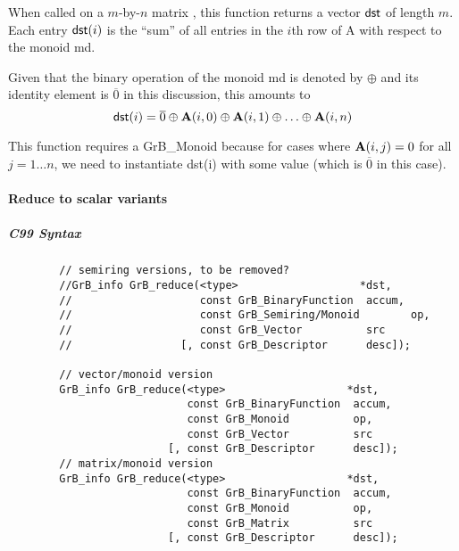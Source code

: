 When called on a $m$-by-$n$ matrix , this function returns a vector ${\sf dst}$ of length $m$. Each entry
${\sf dst}(i)$ is the ``sum'' of all entries in the $i$th row of {\sf A} with respect to the monoid {\sf md}. 

Given that the binary operation of the monoid {\sf md} is denoted by $\oplus$ and its identity element is $\overline{0}$ in this discussion, 
this amounts to $$ {\sf dst}(i) = \overline{0} \oplus {\bf A}(i,0) \oplus {\bf A}(i,1) \oplus  \ldots \oplus  {\bf A}(i,n) $$

This function requires a GrB\_Monoid because for cases where ${\bf A}(i,j) = 0$ for all $j=1 \ldots n$, we need to instantiate {\sf dst}(i) with some value (which
is $\overline{0}$ in this case).




\paragraph{Reduce to scalar variants}





\subparagraph{C99 Syntax}

\begin{verbatim}
        // semiring versions, to be removed?
        //GrB_info GrB_reduce(<type>                   *dst,
        //                    const GrB_BinaryFunction  accum,
        //                    const GrB_Semiring/Monoid        op,
        //                    const GrB_Vector          src
        //                 [, const GrB_Descriptor      desc]);
                         
        // vector/monoid version
        GrB_info GrB_reduce(<type>                   *dst,
                            const GrB_BinaryFunction  accum,
                            const GrB_Monoid          op,
                            const GrB_Vector          src
                         [, const GrB_Descriptor      desc]);
        // matrix/monoid version
        GrB_info GrB_reduce(<type>                   *dst,
                            const GrB_BinaryFunction  accum,
                            const GrB_Monoid          op,
                            const GrB_Matrix          src
                         [, const GrB_Descriptor      desc]);
\end{verbatim}


